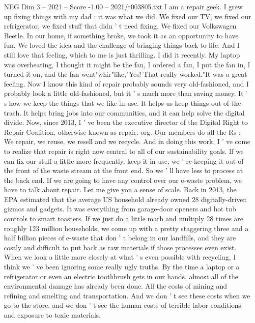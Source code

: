 \begin{textsample}{NEG Dim 3 – 2021 – Score -1.00 – 2021/t003805.txt}  \label{ex:f3_neg_053}
I am a repair geek.
I grew up fixing things with my dad ; it was what we did.
We fixed our TV, we fixed our refrigerator, we fixed stuff that didn ' t need fixing.
We fixed our Volkswagen Beetle.
In our home, if something broke, we took it as an opportunity to have fun.
We loved the idea and the challenge of bringing things back to life.
And I still love that feeling, which to me is just thrilling.
I did it recently.
My laptop was overheating, I thought it might be the fan, I ordered a fan, I put the fan in, I turned it on, and the fan went"whir"like,"Yes!
That really worked."It was a great feeling.
Now I know this kind of repair probably sounds very old-fashioned, and I probably look a little old-fashioned, but it ' s much more than saving money.
It ' s how we keep the things that we like in use.
It helps us keep things out of the trash.
It helps bring jobs into our communities, and it can help solve the digital divide.
Now, since 2013, I ' ve been the executive director of the Digital Right to Repair Coalition, otherwise known as repair. org.
Our members do all the Rs : We repair, we reuse, we resell and we recycle.
And in doing this work, I ' ve come to realize that repair is right now central to all of our sustainability goals.
If we can fix our stuff a little more frequently, keep it in use, we ' re keeping it out of the front of the waste stream at the front end.
So we ' ll have less to process at the back end.
If we are going to have any control over our e-waste problem, we have to talk about repair.
Let me give you a sense of scale.
Back in 2013, the EPA estimated that the average US household already owned 28 digitally-driven gizmos and gadgets.
It was everything from garage-door openers and hot tub controls to smart toasters.
If we just do a little math and multiply 28 times are roughly 123 million households, we come up with a pretty staggering three and a half billion pieces of e-waste that don ' t belong in our landfills, and they are costly and difficult to put back as raw materials if those processes even exist.
When we look a little more closely at what ' s even possible with recycling, I think we ' ve been ignoring some really ugly truths.
By the time a laptop or a refrigerator or even an electric toothbrush gets in our hands, almost all of the environmental damage has already been done.
All the costs of mining and refining and smelting and transportation.
And we don ' t see these costs when we go to the store, and we don ' t see the human costs of terrible labor conditions and exposure to toxic materials.

\end{textsample}
